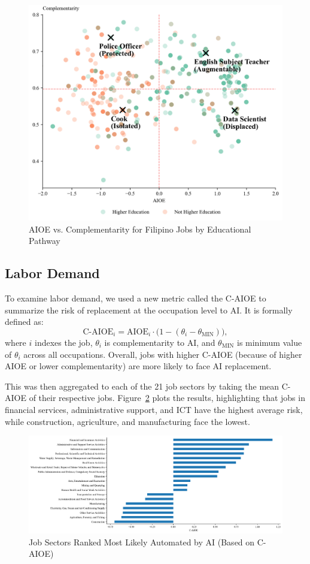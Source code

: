 \begin{figure}[ht] 
    \centering 
    \includegraphics[width=\linewidth]{../figures/aioe_comple.png} 
    \caption{AIOE vs. Complementarity for Filipino Jobs by Educational Pathway}
    \label{fig:scatter_aioe_comple} 
\end{figure}

\subsection{Labor Demand}
To examine labor demand, we used a new metric called the C-AIOE to summarize the risk of replacement at the occupation level to AI.
It is formally defined as:
$$\text{C-AIOE}_i = \text{AIOE}_i \cdot \big(1 - (\theta_i - \theta_{\text{MIN}})\big),$$
where $i$ indexes the job, $\theta_i$ is complementarity to AI, and $\theta_{\text{MIN}}$ is minimum value of $\theta_i$ across all occupations. 
Overall, jobs with higher C-AIOE (because of higher AIOE or lower complementarity) are more likely to face AI replacement. 

This was then aggregated to each of the 21 job sectors by taking the mean C-AIOE of their respective jobs. 
Figure~\ref{fig:sector_caioe} plots the results, highlighting that jobs in financial services, administrative support, 
and ICT have the highest average risk, while construction, agriculture, and manufacturing 
face the lowest.


\begin{figure}[ht] 
    \centering 
    \includegraphics[width=\linewidth]{../figures/sector_caioe.png} 
    \caption{Job Sectors Ranked Most Likely Automated by AI (Based on C-AIOE)}
    \label{fig:sector_caioe} 
\end{figure}

